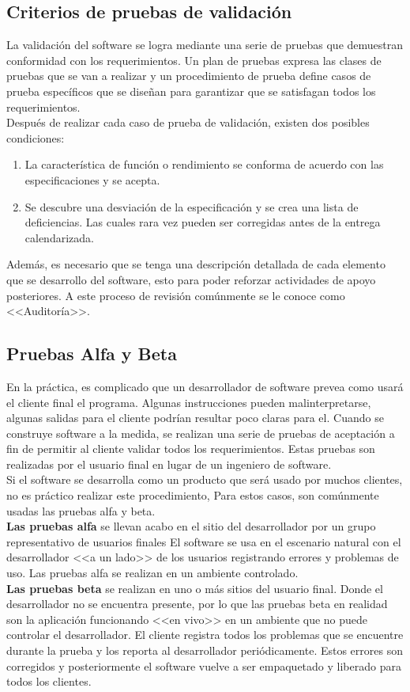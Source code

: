 \subsection{Criterios de pruebas de validación}
La validación del software se logra mediante una serie de pruebas que demuestran conformidad con los requerimientos. Un plan de pruebas expresa las clases de pruebas que se van a realizar y un procedimiento de prueba define casos de prueba específicos que se diseñan para garantizar que se satisfagan todos los requerimientos.\\
Después de realizar cada caso de prueba de validación, existen dos posibles condiciones:
\begin{enumerate}
	\item La característica de función o rendimiento se conforma de acuerdo con las especificaciones y se acepta.
	\item Se descubre una desviación de la especificación y se crea una lista de deficiencias. Las cuales rara vez pueden ser corregidas antes de la entrega calendarizada.
\end{enumerate}
Además, es necesario que se tenga una descripción detallada de cada elemento que se desarrollo del software, esto para poder reforzar actividades de apoyo posteriores. A este proceso de revisión comúnmente se le conoce como <<Auditoría>>.
\subsection{Pruebas Alfa y Beta}
En la práctica, es complicado que un desarrollador de software prevea como usará el cliente final el programa. Algunas instrucciones pueden malinterpretarse, algunas salidas para el cliente podrían resultar poco claras para el. Cuando se construye software a la medida, se realizan una serie de pruebas de aceptación a fin de permitir al cliente validar todos los requerimientos. Estas pruebas son realizadas por el usuario final en lugar de un ingeniero de software.\\ Si el software se desarrolla como un producto que será usado por muchos clientes, no es práctico realizar este procedimiento, Para estos casos, son comúnmente usadas las pruebas alfa y beta.\\
\textbf{Las pruebas alfa} se llevan acabo en el sitio del desarrollador por un grupo representativo de usuarios finales El software se usa en el escenario natural con el desarrollador <<a un lado>> de los usuarios registrando errores y problemas de uso. Las pruebas alfa se realizan en un ambiente controlado.\\
\textbf{Las pruebas beta} se realizan en uno o más sitios del usuario final. Donde el desarrollador no se encuentra presente, por lo que las pruebas beta en realidad son la aplicación funcionando <<en vivo>> en un ambiente que no puede controlar el desarrollador. El cliente registra todos los problemas que se encuentre durante la prueba y los reporta al desarrollador periódicamente. Estos errores son corregidos y posteriormente el software vuelve a ser empaquetado y liberado para todos los clientes.
